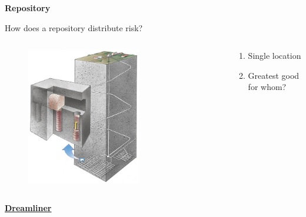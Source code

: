 \documentclass[aspectratio=1610,pdftex,dvipsnames,compress,xcolor={dvipsnames}]{beamer}
\begin{document}
\begin{frame}[plain]{}
    \centering\LARGE\textbf{Repository}
\end{frame}


\addtocounter{framenumber}{-1}
\begin{frame}{How does a repository distribute risk?}
    \begin{columns}[c]

        \begin{column}{0.65\textwidth}
            \begin{figure}
                \centering
                \includegraphics[width=0.65\textwidth]{kbs.jpg}
            \end{figure}
        \end{column}

        \begin{column}{0.35\textwidth}
            \begin{enumerate}[series=outerlist,topsep=0pt,itemsep=21pt,leftmargin=*,label=(\arabic*)]
                \item[]Single location
                \item[]Greatest good for whom?
            \end{enumerate}
        \end{column}

    \end{columns}
\end{frame}


\begin{frame}[plain]{}
    \centering\LARGE\textbf{\href{https://youtu.be/rvkEpstd9os}{Dreamliner}}
\end{frame}
\end{document}
